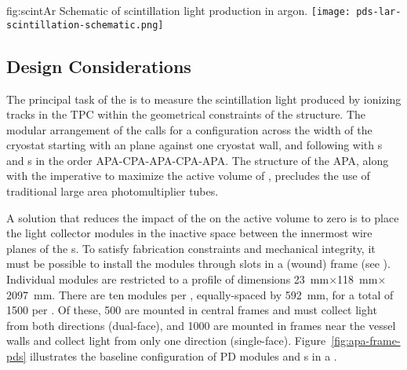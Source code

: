 \begin{dunefigure}{fig:scintAr}
{Schematic of scintillation light production in argon.}
\texttt{[image: pds-lar-scintillation-schematic.png]}
\end{dunefigure}

\subsection{Design Considerations}
\label{sec:fdsp-pd-des-consid}

The principal task of the   is to measure the  scintillation light produced by ionizing tracks in the TPC within the geometrical constraints of the  structure. The modular arrangement of the  calls for a configuration across the width of the cryostat starting with an  plane against one cryostat wall, and following with s and s in the order  APA-CPA-APA-CPA-APA.
The structure of the APA, along with the imperative to maximize the active volume of , precludes the use of traditional large area photomultiplier tubes.  

A solution that reduces the impact of the  on the active volume to zero is to place the light collector modules in the inactive space between the innermost wire planes of the s. To satisfy  fabrication constraints and mechanical integrity, it must be possible to install the modules through slots in a (wound)  frame 
(see \spchapa).  
Individual  modules are restricted to a profile of dimensions \SI{23}{mm}$\times$\SI{118}{mm}$\times$ \SI{2097}{mm}.  There are ten  modules per , equally-spaced by \SI{592}{mm}, for a total of \num{1500} per .  Of these, \num{500} are mounted in central  frames and must collect light from both directions (dual-face), and \num{1000} are mounted in frames  near the vessel walls and collect light from only one direction (single-face).
Figure~\ref{fig:apa-frame-pds} illustrates the baseline configuration of PD modules and s in a . 

